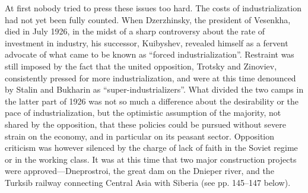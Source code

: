 At first nobody tried to press these issues too hard. The costs of industrialization had not yet been fully counted. When Dzerzhinsky, the president of Vesenkha, died in July 1926, in the midst of a sharp controversy about the rate of investment in industry, his successor, Kuibyshev, revealed himself as a fervent advocate of what came to be known as ``forced industrialization''. Restraint was still imposed by the fact that the united opposition, Trotsky and Zinoviev, consistently pressed for more industrialization, and were at this time denounced by Stalin and Bukharin as ``super-industrializers''. What divided the two camps in the latter part of 1926 was not so much a difference about the desirability or the pace of industrialization, but the optimistic assumption of the majority, not shared by the opposition, that these policies could be pursued without severe strain on the economy, and in particular on its peasant sector. Opposition criticism was however silenced by the charge of lack of faith in the Soviet regime or in the working class. It was at this time that two major construction projects were approved---Dneprostroi, the great dam on the Dnieper river, and the Turksib railway connecting Central Asia with Siberia (see pp. 145--147 below). 

